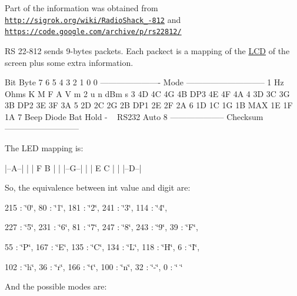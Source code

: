 Part of the information was obtained from \href{http://sigrok.org/wiki/RadioShack_22-812}{\tt http\-://sigrok.\-org/wiki/\-Radio\-Shack\-\_-\/812} and \href{https://code.google.com/archive/p/rs22812/}{\tt https\-://code.\-google.\-com/archive/p/rs22812/}

R\-S 22-\/812 sends 9-\/bytes packets. Each packect is a mapping of the \hyperlink{class_l_c_d}{L\-C\-D} of the screen plus some extra information. \begin{DoxyVerb}                                    Bit
    Byte    7       6       5       4       3       2       1       0
    0       ---------------------- Mode -----------------------------
    1       Hz      Ohms    K       M       F       A       V       m
    2       u       n       dBm     s       %
    3       4D      4C      4G      4B      DP3     4E      4F      4A
    4       3D      3C      3G      3B      DP2     3E      3F      3A
    5       2D      2C      2G      2B      DP1     2E      2F      2A
    6       1D      1C      1G      1B      MAX     1E      1F      1A
    7       Beep    Diode   Bat     Hold    -       ~       RS232   Auto
    8       -------------------- Checksum ---------------------------
\end{DoxyVerb}
 The L\-E\-D mapping is\-: \begin{DoxyVerb}    |--A--|
    |     |
    F     B
    |     |
    |--G--|
    |     |
    E     C
    |     |
    |--D--|
\end{DoxyVerb}
 So, the equivalence between int value and digit are\-:

215 \-: \char`\"{}0\char`\"{}, 80 \-: \char`\"{}1\char`\"{}, 181 \-: \char`\"{}2\char`\"{}, 241 \-: \char`\"{}3\char`\"{}, 114 \-: \char`\"{}4\char`\"{},\par
 227 \-: \char`\"{}5\char`\"{}, 231 \-: \char`\"{}6\char`\"{}, 81 \-: \char`\"{}7\char`\"{}, 247 \-: \char`\"{}8\char`\"{}, 243 \-: \char`\"{}9\char`\"{}, 39 \-: \char`\"{}\-F\char`\"{},\par
 55 \-: \char`\"{}\-P\char`\"{}, 167 \-: \char`\"{}\-E\char`\"{}, 135 \-: \char`\"{}\-C\char`\"{}, 134 \-: \char`\"{}\-L\char`\"{}, 118 \-: \char`\"{}\-H\char`\"{}, 6 \-: \char`\"{}\-I\char`\"{},\par
 102 \-: \char`\"{}h\char`\"{}, 36 \-: \char`\"{}r\char`\"{}, 166 \-: \char`\"{}t\char`\"{}, 100 \-: \char`\"{}n\char`\"{}, 32 \-: \char`\"{}-\/\char`\"{}, 0 \-: \char`\"{} \char`\"{}\par
 And the possible modes are\-:

